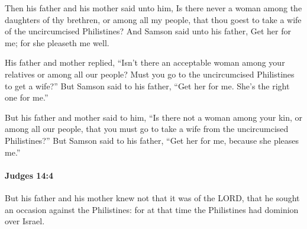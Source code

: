 			\begin{versebox}
					\item[BHS] 
					\item[ASV] Then his father and his mother said unto him, Is there never a woman among the daughters of thy brethren, or among all my people, that thou goest to take a wife of the uncircumcised Philistines? And Samson said unto his father, Get her for me; for she pleaseth me well.
					\item[NIV] His father and mother replied, “Isn’t there an acceptable woman among your relatives or among all our people? Must you go to the uncircumcised Philistines to get a wife?” But Samson said to his father, “Get her for me. She’s the right one for me.”
					\item[NRSV] But his father and mother said to him, “Is there not a woman among your kin, or among all our people, that you must go to take a wife from the uncircumcised Philistines?” But Samson said to his father, “Get her for me, because she pleases me.”
			\end{versebox}

		\paragraph{Judges 14:4} %
			\label{JUDGES-14-4}

			But his father and his mother knew not that it was of the LORD, that he sought an occasion against the Philistines: for at that time the Philistines had dominion over Israel.

